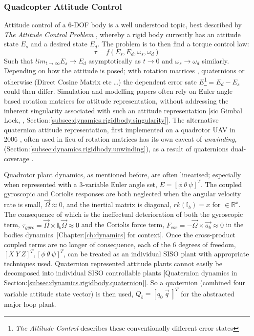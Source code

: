 \subsubsection*{Quadcopter Attitude Control}
Attitude control of a 6-DOF body is a well understood topic, best described by \emph{The Attitude Control Problem} \cite{attitudecontrolproblem}, whereby a rigid body currently has an attitude state $E_s$ and a desired state $E_d$. The problem is to then find a torque control law:
\begin{equation} \label{eq:2}
\tau = f(E_s,E_d,\omega_s,\omega_d)
\end{equation}
Such that $lim_{t\rightarrow\infty}E_s \rightarrow E_d$ asymptotically as $t \rightarrow 0$ and $\omega_s \rightarrow \omega_d$ similarly. Depending on how the attitude is posed; with rotation matrices \cite{rigidbodylecture,eulerrigidbody,rotationsequences}, quaternions \cite{quaterniondynamics, rotationsequences, spacecraftattitutdequaternions,fullquaternion} or otherwise (Direct Cosine Matrix etc \ldots) the dependent error sate $E$\footnote{\emph{The Attitude Control} \cite{attitudecontrolproblem} describes these conventionally different error states}$= E_d - E_s$ could then differ. Simulation and modelling papers often rely on Euler angle based rotation matrices for attitude representation, \cite{quadsimulationcontrol, adaptivedisturbancecontrol, optimizedpidquadcopter, singleaxistilting, backsteppingquadcoptercontrol, fullquadcoptercontrol} without addressing the inherent singularity associated with such an attitude representation [sic Gimbal Lock, \cite{euleranglesingularity}, Section:\ref{subsec:dynamics.rigidbody.singularity}]. The alternative quaternion attitude representation, first implemented on a quadrotor UAV in 2006 \cite{attitudestabilization}, often used in lieu of rotation matrices has its own caveat of \emph{unwinding}, (Section:\ref{subsec:dynamics.rigidbody.unwinding}), as a result of quaternions dual-coverage \cite{unwinding}.
\par
Quadrotor plant dynamics, as mentioned before, are often linearised; especially when represented with a 3-variable Euler angle set, $E = [\phi ~\theta ~\psi]^T$. The coupled gyroscopic and Coriolis responses are both neglected when the angular velocity rate is small, $\vec{\Omega} \approx 0$, and the inertial matrix is diagonal, $rk(\mathbb{I}_b)= x$ for $\in\mathbb{R}^x$. The consequence of which is the ineffectual deterioration of both the gyroscopic term, $\tau_{gyro}=\vec{\Omega} \times \mathbb{I}_b\vec{\Omega} \approx 0$ and the  Coriolis force term, $F_{cor}=-\vec{\Omega} \times \vec{a_b} \approx 0$ in the bodies dynamics~[Chapter:\ref{ch:dynamics} for context]. Once the cross-product coupled terms are no longer of consequence, each of the 6 degrees of freedom, $[X ~Y ~Z]^T, [\phi ~\theta ~\psi]^T$, can be treated as an individual SISO plant with appropriate techniques used. Quaternion represented attitude plants cannot easily be decomposed into individual SISO controllable plants [Quaternion dynamics in Section:\ref{subsec:dynamics.rigidbody.quaternion}]. So a quaternion (combined four variable attitude state vector) is then used, $Q_b = [q_0 ~\vec{q}\>]^T$ for the abstracted major loop plant.
